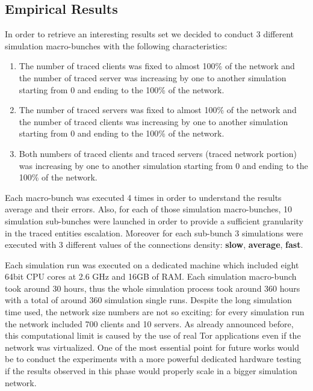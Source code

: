 \subsection{Empirical Results}
In order to retrieve an interesting results set we decided to conduct
3 different simulation macro-bunches with the following characteristics:
\begin{enumerate}
	\item The number of traced clients was fixed to almost 100\% of the
network and the number of traced server was increasing by one to another
simulation starting from 0 and ending to the 100\% of the network.
	\item The number of traced servers was fixed to almost 100\% of the
network and the number of traced clients was increasing by one to another
simulation starting from 0 and ending to the 100\% of the network.
	\item Both numbers of traced clients and traced servers (traced
network portion) was increasing by one to another
simulation starting from 0 and ending to the 100\% of the network.
\end{enumerate}

Each macro-bunch was executed 4 times in order to understand the results
average and their errors. 
Also, for each of those simulation macro-bunches, 10 simulation sub-bunches were
launched in order to provide a sufficient granularity in the traced
entities escalation. Moreover for each sub-bunch 3 simulations were
executed with 3 different values of the connections density: \textbf{slow},
\textbf{average}, \textbf{fast}. 

Each simulation run was executed on a dedicated machine which included
 eight 64bit CPU cores at 2.6 GHz and 16GB of RAM. Each simulation
macro-bunch took around 30 hours, thus the whole simulation process took
around 360 hours with a total of around 360 simulation single runs.
Despite the long simulation time used, the network size numbers are not
so exciting: for every simulation run the network included 700 clients
and 10 servers. As already announced before, this computational limit is
caused by the use of real Tor applications even if the network was
virtualized. One of the most essential point for future works would be to
conduct the experiments with a more powerful dedicated hardware testing
if the results observed in this phase would properly scale in a bigger
simulation network. 


